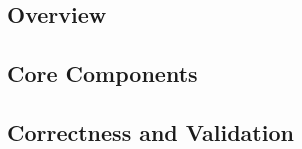 \placeholder

\subsection{Overview}
\placeholder

\subsection{Core Components}
\placeholder

\subsection{Correctness and Validation}
\placeholder

